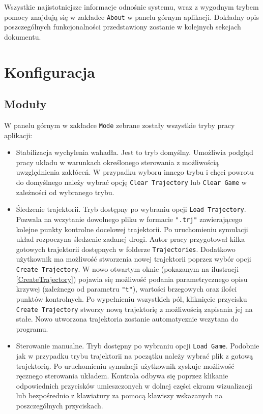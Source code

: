 \documentclass[12pt, twoside, openany]{report}
\theoremstyle{definition}
\begin{document}
Wszystkie najistotniejsze informacje odnośnie systemu, wraz z wygodnym trybem pomocy znajdują się w zakładce \texttt{About} w panelu górnym aplikacji. Dokładny opis poszczególnych funkcjonalności przedstawiony zostanie w kolejnych sekcjach dokumentu.

\section{Konfiguracja}
\subsection{Moduły}
W panelu górnym w zakładce \texttt{Mode} zebrane zostały wszystkie tryby pracy aplikacji:
\begin{itemize}
\item Stabilizacja wychylenia wahadła. Jest to tryb domyślny. Umożliwia podgląd pracy układu w warunkach określonego sterowania z możliwością uwzględnienia zakłóceń. W przypadku wyboru innego trybu i chęci powrotu do domyślnego należy wybrać opcję \texttt{Clear Trajectory} lub \texttt{Clear Game} w zależności od wybranego trybu.
\item Śledzenie trajektorii. Tryb dostępny po wybraniu opcji \texttt{Load Trajectory}. Pozwala na wczytanie dowolnego pliku w formacie \texttt{".trj"} zawierającego kolejne punkty kontrolne docelowej trajektorii. Po uruchomieniu symulacji układ rozpoczyna śledzenie zadanej drogi. Autor pracy przygotował kilka gotowych trajektorii dostępnych w folderze \texttt{Trajectories}. Dodatkowo użytkownik ma możliwość stworzenia nowej trajektorii poprzez wybór opcji \texttt{Create Trajectory}. W nowo otwartym oknie (pokazanym na ilustracji \ref{CreateTrajectory}) pojawia się możliwość podania parametrycznego opisu krzywej (zależnego od parametru \texttt{"t"}), wartości brzegowych oraz ilości punktów kontrolnych. Po wypełnieniu wszystkich pól, kliknięcie przycisku \texttt{Create Trajectory} stworzy nową trajektorię z możliwością zapisania jej na stałe. Nowo utworzona trajektoria zostanie automatycznie wczytana do programu.
\item Sterowanie manualne. Tryb dostępny po wybraniu opcji \texttt{Load Game}. Podobnie jak w przypadku trybu trajektorii na początku należy wybrać plik z gotową trajektorią. Po uruchomieniu symulacji użytkownik zyskuje możliwość ręcznego sterowania układem. Kontrola odbywa się poprzez klikanie odpowiednich przycisków umieszczonych w dolnej części ekranu wizualizacji lub bezpośrednio z klawiatury za pomocą klawiszy wskazanych na poszczególnych przyciskach.
\end{itemize}
\end{document}
